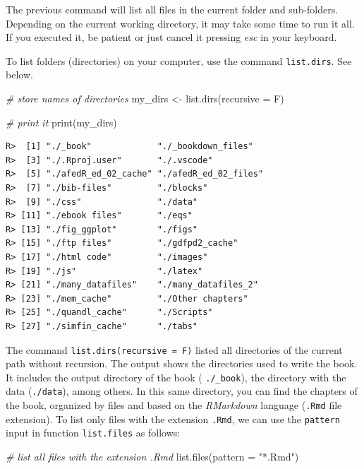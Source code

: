 \documentclass[
  12pt,
]{book}
\newenvironment{Shaded}{\begin{snugshade}}{\end{snugshade}}
\newcommand{\AttributeTok}[1]{\textcolor[rgb]{0.61,0.61,0.61}{#1}}
\newcommand{\CommentTok}[1]{\textcolor[rgb]{0.37,0.37,0.37}{\textit{#1}}}
\newcommand{\FunctionTok}[1]{\textcolor[rgb]{0,0,0}{#1}}
\newcommand{\NormalTok}[1]{#1}
\newcommand{\OtherTok}[1]{\textcolor[rgb]{0.37,0.37,0.37}{#1}}
\newcommand{\StringTok}[1]{\textcolor[rgb]{0.5,0.5,0.5}{#1}}
\begin{document}
The previous command will list all files in the current folder and sub-folders. Depending on the current working directory, it may take some time to run it all. If you executed it, be patient or just cancel it pressing \emph{esc} in your keyboard.

To list folders (directories) on your computer, use the command \texttt{list.dirs}. See below. 

\begin{Shaded}
\begin{Highlighting}[]
\CommentTok{\# store names of directories}
\NormalTok{my\_dirs }\OtherTok{\textless{}{-}} \FunctionTok{list.dirs}\NormalTok{(}\AttributeTok{recursive =}\NormalTok{ F)}

\CommentTok{\# print it}
\FunctionTok{print}\NormalTok{(my\_dirs)}
\end{Highlighting}
\end{Shaded}

\begin{verbatim}
R>  [1] "./_book"             "./_bookdown_files"  
R>  [3] "./.Rproj.user"       "./.vscode"          
R>  [5] "./afedR_ed_02_cache" "./afedR_ed_02_files"
R>  [7] "./bib-files"         "./blocks"           
R>  [9] "./css"               "./data"             
R> [11] "./ebook files"       "./eqs"              
R> [13] "./fig_ggplot"        "./figs"             
R> [15] "./ftp files"         "./gdfpd2_cache"     
R> [17] "./html code"         "./images"           
R> [19] "./js"                "./latex"            
R> [21] "./many_datafiles"    "./many_datafiles_2" 
R> [23] "./mem_cache"         "./Other chapters"   
R> [25] "./quandl_cache"      "./Scripts"          
R> [27] "./simfin_cache"      "./tabs"
\end{verbatim}

The command \texttt{list.dirs(recursive\ =\ F)} listed all directories of the current path without recursion. The output shows the directories used to write the book. It includes the output directory of the book ( \texttt{./\_book}), the directory with the data (\texttt{./data}), among others. In this same directory, you can find the chapters of the book, organized by files and based on the \emph{RMarkdown} language (\texttt{.Rmd} file extension). To list only files with the extension \texttt{.Rmd}, we can use the \texttt{pattern} input in function \texttt{list.files} as follows:

\begin{Shaded}
\begin{Highlighting}[]
\CommentTok{\# list all files with the extension .Rmd}
\FunctionTok{list.files}\NormalTok{(}\AttributeTok{pattern =} \StringTok{"*.Rmd"}\NormalTok{)}
\end{Highlighting}
\end{Shaded}
\end{document}
